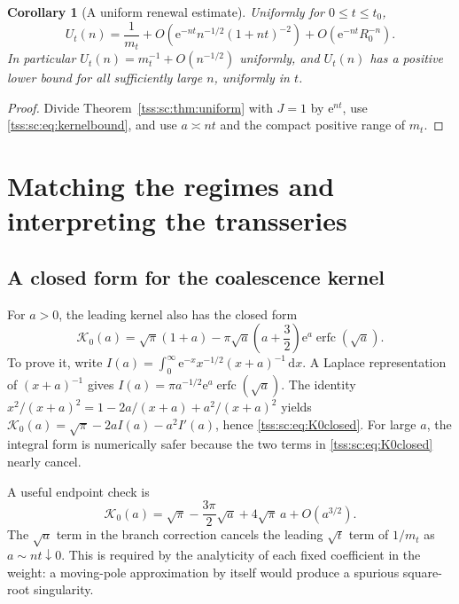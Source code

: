\documentclass[11pt]{article}
\newtheorem{corollary}[theorem]{Corollary}
\theoremstyle{remark}\newtheorem{remark}[theorem]{Remark}
\theoremstyle{definition}\newtheorem{definition}[theorem]{Definition}
\newcommand{\dd}{\mathrm d}
\newcommand{\e}{\mathrm e}
\newcommand{\Kc}{\mathcal K}
\begin{document}
\begin{corollary}[A uniform renewal estimate]\label{tss:sc:cor:renewal}
Uniformly for $0\leq t\leq t_0$,
\begin{equation}\label{tss:sc:eq:renewalerror}
 U_t(n)=\frac1{m_t}
 +O\left(\e^{-nt}n^{-1/2}(1+nt)^{-2}\right)
 +O\left(\e^{-nt}R_0^{-n}\right).
\end{equation}
In particular $U_t(n)=m_t^{-1}+O(n^{-1/2})$ uniformly, and $U_t(n)$ has a positive lower bound for all sufficiently large $n$, uniformly in $t$.
\end{corollary}
\begin{proof}
Divide Theorem~\ref{tss:sc:thm:uniform} with $J=1$ by $\e^{nt}$, use \eqref{tss:sc:eq:kernelbound}, and use $a\asymp nt$ and the compact positive range of $m_t$.
\end{proof}

\section{Matching the regimes and interpreting the transseries}
\label{tss:sc:sec:matching}

\subsection{A closed form for the coalescence kernel}
For $a>0$, the leading kernel also has the closed form
\begin{equation}\label{tss:sc:eq:K0closed}
 \Kc_0(a)=\sqrt\pi(1+a)
 -\pi\sqrt a\left(a+\frac32\right)\e^a\operatorname{erfc}(\sqrt a).
\end{equation}
To prove it, write
$I(a)=\int_0^\infty \e^{-x}x^{-1/2}(x+a)^{-1}\,\dd x$.
A Laplace representation of $(x+a)^{-1}$ gives
$I(a)=\pi a^{-1/2}\e^a\operatorname{erfc}(\sqrt a)$.
The identity $x^2/(x+a)^2=1-2a/(x+a)+a^2/(x+a)^2$ yields
$\Kc_0(a)=\sqrt\pi-2aI(a)-a^2I'(a)$, hence \eqref{tss:sc:eq:K0closed}.
For large $a$, the integral form is numerically safer because the two terms in \eqref{tss:sc:eq:K0closed} nearly cancel.

A useful endpoint check is
\begin{equation}\label{tss:sc:eq:K0small}
 \Kc_0(a)=\sqrt\pi-\frac{3\pi}{2}\sqrt a+4\sqrt\pi\,a+O(a^{3/2}).
\end{equation}
The $\sqrt a$ term in the branch correction cancels the leading $\sqrt t$ term of $1/m_t$ as $a\sim nt\downarrow0$. This is required by the analyticity of each fixed coefficient in the weight: a moving-pole approximation by itself would produce a spurious square-root singularity.
\end{document}
